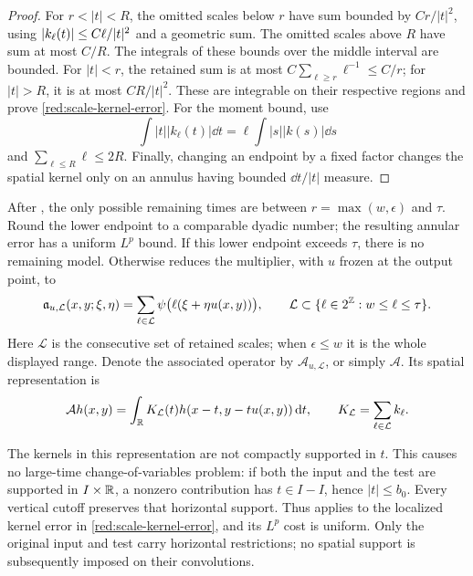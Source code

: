 \begin{proof}
For \(r<|t|<R\), the omitted scales below \(r\) have sum bounded
by \(C r/|t|^2\), using
\(\left|k_\ell(t)\right|\le C\ell/|t|^2\) and a geometric sum.
The omitted scales above \(R\) have sum at most \(C/R\).
The integrals of these bounds over the middle interval are bounded.
For \(|t|<r\), the retained sum is at most
\(C\sum_{\ell\ge r}\ell^{-1}\le C/r\); for \(|t|>R\),
it is at most \(C R/|t|^2\). These are integrable on their
respective regions and prove \eqref{red:scale-kernel-error}.
For the moment bound, use
\[
 \int |t||k_\ell(t)|\dd t
          =\ell\int |s||k(s)|\dd s
\]
and \(\sum_{\ell\le R}\ell\le2R\). Finally, changing an
endpoint by a fixed factor changes the spatial kernel only on an
annulus having bounded \(\dd t/|t|\) measure.
\end{proof}

After , the only possible remaining times
are between \(r=\max(w,\epsilon)\) and \(\tau\). Round the
lower endpoint to a comparable dyadic number; the resulting annular
error has a uniform \(L^p\) bound. If this lower endpoint exceeds
\(\tau\), there is no remaining model. Otherwise
 reduces the multiplier, with \(u\)
frozen at the output point, to
\begin{equation}\label{eq:src-2}
 \mathfrak a_{u,\mathcal L}(x,y;\xi,\eta)
    =\sum_{\ell\in\mathcal L}
           \psi\bigl(\ell(\xi+\eta u(x,y))\bigr),
 \qquad
 \mathcal L\subset\{\ell\in2^{\mathbb Z}:w\le\ell\le\tau\}.
\end{equation}
Here \(\mathcal L\) is the consecutive set of retained scales;
when \(\epsilon\le w\) it is the whole displayed range. Denote
the associated operator by \(\mathcal A_{u,\mathcal L}\), or
simply \(\mathcal A\). Its spatial representation is
\[
 \mathcal A h(x,y)
   =\int_\mathbb R K_{\mathcal L}(t)
                  h(x-t,y-tu(x,y))\,\mathrm d t,
 \qquad K_{\mathcal L}=\sum_{\ell\in\mathcal L}k_\ell.
\]

The kernels in this representation are not compactly supported in
\(t\). This causes no large-time change-of-variables problem: if
both the input and the test are supported in \(I\times\mathbb R\), a
nonzero contribution has \(t\in I-I\), hence \(|t|\le b_0\).
Every vertical cutoff preserves that horizontal support. Thus
 applies to the localized kernel error in
\eqref{red:scale-kernel-error}, and its \(L^p\) cost is uniform.
Only the original input and test carry horizontal restrictions;
no spatial support is subsequently imposed on their convolutions.

